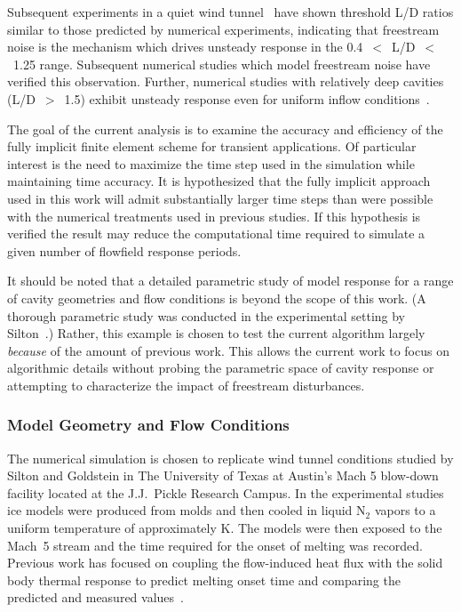 \clearpage
Subsequent experiments in a quiet wind tunnel~\cite{engblom_goldstein_AIAA-1996-667} have shown threshold L/D ratios similar to those predicted by numerical experiments, indicating that freestream noise is the mechanism which drives unsteady response in the 0.4~$<$~L/D~$<$~1.25 range.  Subsequent numerical studies which model freestream noise have verified this observation.  Further, numerical studies with relatively deep cavities (L/D~$>$~1.5) exhibit unsteady response even for uniform inflow conditions~\cite{engblom_goldstein_AIAA-1996-354,silton_goldstein_JTHPHT}. 

The goal of the current analysis is to examine the accuracy and efficiency of the fully implicit finite element scheme for transient applications.  Of particular interest is the need to maximize the time step used in the simulation while maintaining time accuracy.  It is hypothesized that the fully implicit approach used in this work will admit substantially larger time steps than were possible with the numerical treatments used in previous studies. If this hypothesis is verified the result may reduce the computational time required to simulate a given number of flowfield response periods.

It should be noted that a detailed parametric study of model response for a range of cavity geometries and flow conditions is beyond the scope of this work. (A thorough parametric study was conducted in the experimental setting by Silton~\cite{silton_dissertation}.)  Rather, this example is chosen to test the current algorithm largely \emph{because} of the amount of previous work.  This allows the current work to focus on algorithmic details without probing the parametric space of cavity response or attempting to characterize the impact of freestream disturbances.

\subsubsection{Model Geometry and Flow Conditions}
The numerical simulation is chosen to replicate wind tunnel conditions studied by Silton and Goldstein in The University of Texas at Austin's Mach 5 blow-down facility located at the J.J.\ Pickle Research Campus.  In the experimental studies ice models were produced from molds and then cooled in liquid N$_2$ vapors to a uniform temperature of approximately \unit[78]{K}.  The models were then exposed to the Mach~5 stream and the time required for the onset of melting was recorded.  Previous work has focused on coupling the flow-induced heat flux with the solid body thermal response to predict melting onset time and comparing the predicted and measured values~\cite{silton_goldstein_JFM}.

